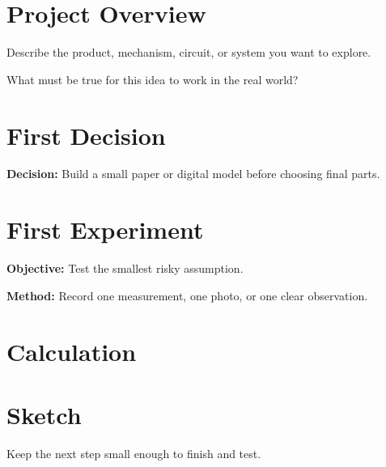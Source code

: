 \documentclass{otengineering}
\begin{document}
\makeotengtitle

\section{Project Overview}

\begin{idea}
  Describe the product, mechanism, circuit, or system you want to explore.
\end{idea}

\begin{questionbox}
  What must be true for this idea to work in the real world?
\end{questionbox}

\section{First Decision}

\begin{decision}
  \entrydate{\today}
  \textbf{Decision:} Build a small paper or digital model before choosing final parts.


\end{decision}

\section{First Experiment}

\begin{experiment}
  \entrydate{\today}
  \textbf{Objective:} Test the smallest risky assumption.

  \textbf{Method:} Record one measurement, one photo, or one clear observation.

\end{experiment}

\section{Calculation}

\begin{calculation}
\end{calculation}

\section{Sketch}


\begin{futurememo}
  Keep the next step small enough to finish and test.
\end{futurememo}
\end{document}
